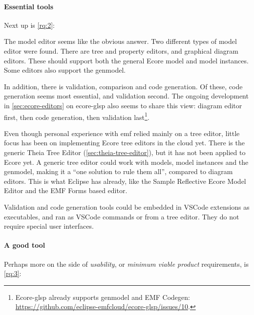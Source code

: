 \paragraph*{Essential tools}
Next up is \cref{rq:2}:
\begin{displayquote}
  
\end{displayquote}

The model editor seems like the obvious answer. 
Two different types of model editor were found.
There are tree and property editors, and graphical diagram editors.
These should support both the general \gls{Ecore} model and model instances.
Some editors also support the genmodel.

In addition, there is validation, comparison and code generation.
Of these, code generation seems most essential, and validation second.
The ongoing development in \cref{sec:ecore-editors} on ecore-glsp also seems to share this view: diagram editor first, then code generation, then validation last\footnote{Ecore-glsp already supports genmodel and EMF Codegen: \href{https://github.com/eclipse-emfcloud/ecore-glsp/issues/10}{https://github.com/eclipse-emfcloud/ecore-glsp/issues/10}.}.

Even though personal experience with \gls{emf} relied mainly on a tree editor, little focus has been on implementing \gls{Ecore} tree editors in the \gls{cloud} yet.
There is the generic Theia Tree Editor (\cref{sec:theia-tree-editor}), but it has not been applied to \gls{Ecore} yet.
A generic tree editor could work with models, model instances and the genmodel, making it a ``one solution to rule them all'', compared to diagram editors.
This is what \gls{Eclipse} has already, like the Sample Reflective Ecore Model Editor and the EMF Forms based editor.

Validation and code generation tools could be embedded in VSCode extensions as executables, and ran as VSCode commands or from a tree editor.
They do not require special user interfaces.

\paragraph*{A good tool}
Perhaps more on the side of \textit{usability}, or \textit{minimum viable product} requirements, is \cref{rq:3}:
\begin{displayquote}
  
\end{displayquote}


